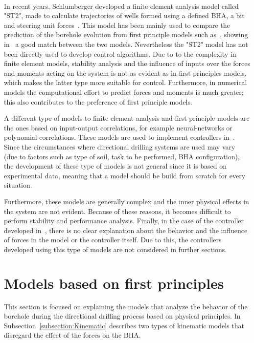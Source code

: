 In recent years, Schlumberger\textsuperscript{\textregistered} developed a finite element analysis model called "ST2", made to calculate trajectories of wells formed using a defined \acs{BHA}, a bit and steering unit forces~\cite{Matheus2014}. This model has been mainly used to compare the prediction of the borehole evolution from first principle models such as~\cite{Down07}, showing in~\cite{Downton2011} a good match between the two models. Nevertheless the "ST2" model has not been directly used to develop control algorithms. Due to to the complexity in finite element models, stability analysis and the influence of inputs over the forces and moments acting on the system is not as evident as in first principles models, which makes the latter type more suitable for control. Furthermore, in numerical models the computational effort to predict forces and moments is much greater; this also contributes to the preference of first principle models.

A different type of models to finite element analysis and first principle models are the ones based on input-output correlations, for example neural-networks or polynomial correlations. These models are used to implement controllers in~\cite{Matheus2014}. Since the circumstances where directional drilling systems are used may vary (due to factors such as type of soil, task to be performed, BHA configuration), the development of these type of models is not general since it is based on experimental data, meaning that a model should be build from scratch for every situation.

 Furthermore, these models are generally complex and the inner physical effects in the system are not evident. Because of these reasons, it becomes difficult to perform stability and performance analysis. Finally, in the case of the controller developed in~\cite{Matheus2014}, there is no clear explanation about the behavior and the influence of forces in the model or the controller itself. Due to this, the controllers developed using this type of models are not considered in further sections.

\section{Models based on first principles}

This section is focused on explaining the models that analyze the behavior of the borehole during the directional drilling process based on physical principles. In Subsection~\ref{subsection:Kinematic} describes two types of kinematic models that disregard the effect of the forces on the BHA. 

